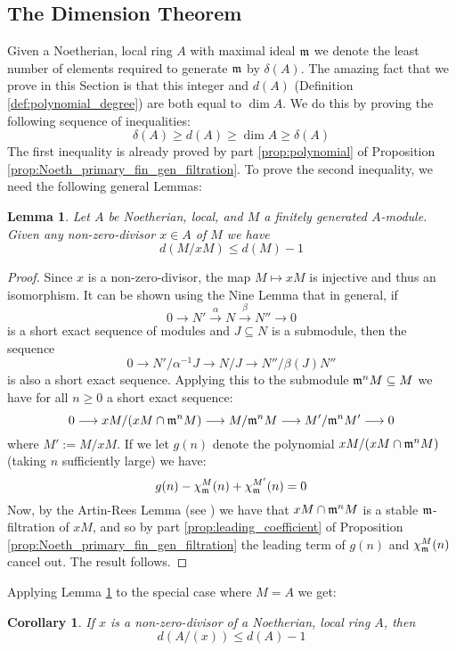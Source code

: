 \documentclass[12pt]{article}
\theoremstyle{plain}
\newtheorem{lemma}[thm]{Lemma}
\newtheorem{cor}[thm]{Corollary}
\theoremstyle{definition}
\newcommand{\lto}{\longrightarrow}
\begin{document}
\subsection{The Dimension Theorem}
Given a Noetherian, local ring $A$ with maximal ideal $\frak{m}$ we denote the least number of elements required to generate $\frak{m}$ by $\delta(A)$. The amazing fact that we prove in this Section is that this integer and $d(A)$ (Definition \ref{def:polynomial_degree}) are both equal to $\operatorname{dim}A$. We do this by proving the following sequence of inequalities:
\[\delta(A) \geq d(A) \geq \operatorname{dim}A \geq \delta(A)\]
The first inequality is already proved by part \ref{prop:polynomial} of Proposition \ref{prop:Noeth_primary_fin_gen_filtration}. To prove the second inequality, we need the following general Lemmas:
\begin{lemma}
\label{lem:degree_modulo}
Let $A$ be Noetherian, local, and $M$ a finitely generated $A$-module. Given any non-zero-divisor $x \in A$ of $M$ we have
\begin{equation}
    \label{eq:dimension_inductive_reduction} d(M/xM) \leq d(M) - 1
\end{equation}
\end{lemma}
\begin{proof}
Since $x$ is a non-zero-divisor, the map $M \longmapsto xM$ is injective and thus an isomorphism. It can be shown using the Nine Lemma that in general, if
\[0 \lto N' \stackrel{\alpha}{\lto} N \stackrel{\beta}{\lto} N'' \lto 0\]
is a short exact sequence of modules and $J \subseteq N$ is a submodule, then the sequence
\[0 \lto N'/\alpha^{-1}J \lto N/J \lto N''/\beta(J)N''\]
is also a short exact sequence. Applying this to the submodule $\frak{m}^nM \subseteq M$ we have for all $n \geq 0$ a short exact sequence:
\[0 \lto xM/(xM \cap \frak{m}^nM) \lto M/\frak{m}^nM \lto M'/\frak{m}^nM' \lto 0\]
where $M' := M/xM$. If we let $g(n)$ denote the polynomial $xM/(xM \cap \frak{m}^nM)$ (taking $n$ sufficiently large) we have:
\[g(n) - \chi_\frak{m}^M(n) + \chi_\frak{m}^{M'}(n) = 0\]
Now, by the Artin-Rees Lemma (see \cite{completion}) we have that $xM \cap \frak{m}^nM$ is a stable $\frak{m}$-filtration of $xM$, and so by part \ref{prop:leading_coefficient} of Proposition \ref{prop:Noeth_primary_fin_gen_filtration} the leading term of $g(n)$ and $\chi_\frak{m}^M(n)$ cancel out. The result follows.
\end{proof}
Applying Lemma \ref{lem:degree_modulo} to the special case where $M = A$ we get:
\begin{cor}
\label{cor:degree_ring_inductive_reduction}
If $x$ is a non-zero-divisor of a Noetherian, local ring $A$, then
\[d(A/(x)) \leq d(A) - 1\]
\end{cor}
\end{document}
